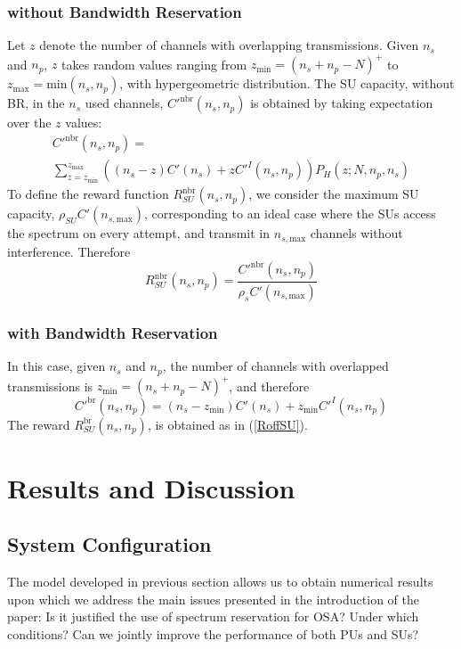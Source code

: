 \subsubsection{without Bandwidth Reservation}
Let $z$ denote the number of channels with overlapping transmissions. Given $n_{s}$ and $n_{p}$, $z$ takes random values ranging from $z_{\text{min}}=\left(n_{s}+n_{p}-N\right)^{+}$ to $z_{\text{max}}=\text{min}\left(n_{s},n_{p}\right)$, with hypergeometric distribution. The SU capacity, without BR, in the $n_{s}$ used channels, $C'^{\text{nbr}}(n_{s},n_{p})$ is obtained by taking expectation over the $z$ values:
\begin{equation}
\begin{array}{l}
C'^{\text{nbr}}(n_{s},n_{p}) = \\ \displaystyle\sum_{z=z_{\text{min}}}^{z_{\text{max}}}\left(\left(n_{s}-z\right)C'(n_{s})+zC'^{I}(n_{s},n_{p})\right)P_{H}\left(z;N,n_{p},n_{s}\right)
\end{array}
\end{equation}
To define the reward function $R^{\text{nbr}}_{SU}\left(n_{s},n_{p}\right)$, we consider the maximum SU capacity, $\rho_{SU}C'(n_{s,\text{max}})$, corresponding to an ideal case where the SUs access the spectrum on every attempt, and transmit in $n_{s,\text{max}}$ channels without interference. Therefore
\begin{equation}\label{RoffSU}
R^{\text{nbr}}_{SU}\left(n_{s},n_{p}\right) = \frac{C'^{\text{nbr}}(n_{s},n_{p})}{\rho_{s}C'(n_{s,\text{max}})}
\end{equation}

\subsubsection{with Bandwidth Reservation}
In this case, given $n_{s}$ and $n_{p}$, the number of channels with overlapped transmissions is $z_{\text{min}}=\left(n_{s}+n_{p}-N\right)^{+}$, and therefore
\begin{equation}
C'^{\text{br}}(n_{s},n_{p}) =\left(n_{s}-z_{\text{min}}\right)C'(n_{s})+z_{\text{min}}C'^{I}(n_{s},n_{p})
\end{equation}
The reward $R^{\text{br}}_{SU}\left(n_{s},n_{p}\right)$, is obtained as in (\ref{RoffSU}).


\section{Results and Discussion}\label{sec:Results}
\subsection{System Configuration}
The model developed in previous section allows us to obtain numerical results upon which we address the main issues presented in the introduction of the paper: Is it justified the use of spectrum reservation for OSA? Under which conditions? Can we jointly improve the performance of both PUs and SUs?

